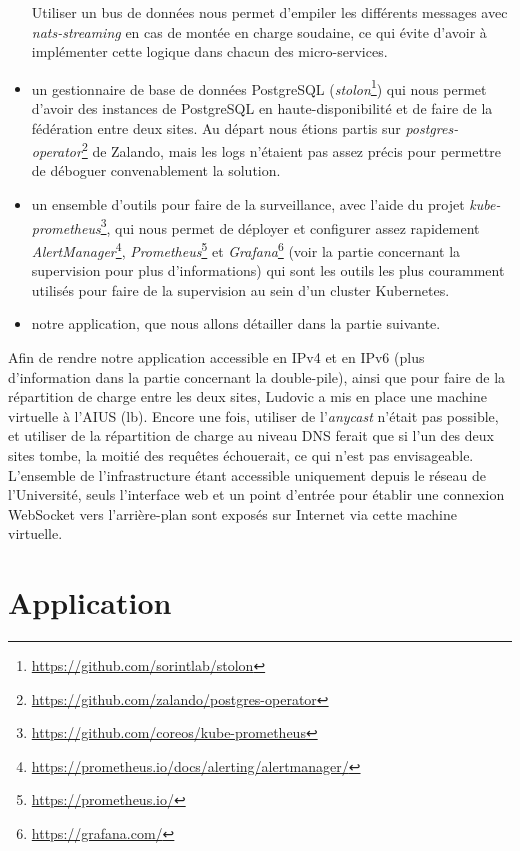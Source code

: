 \begin{itemize}
  Utiliser un bus de données nous permet d'empiler les différents
  messages avec \textit{nats-streaming} en cas de montée en charge
  soudaine, ce qui évite d'avoir à implémenter cette logique dans chacun
  des micro-services.
\item
  un gestionnaire de base de données PostgreSQL
  (\textit{stolon}\footnote{\url{https://github.com/sorintlab/stolon}})
  qui nous permet d'avoir des instances de PostgreSQL en
  haute-disponibilité et de faire de la fédération entre deux sites. Au
  départ nous étions partis sur
  \textit{postgres-operator}\footnote{
    \url{https://github.com/zalando/postgres-operator}}
  de Zalando, mais les logs n'étaient pas assez précis pour permettre de
  déboguer convenablement la solution.
\item
  un ensemble d'outils pour faire de la surveillance, avec l'aide du
  projet \textit{kube-prometheus}\footnote{
    \url{https://github.com/coreos/kube-prometheus}},
  qui nous permet de déployer et configurer assez rapidement
  \textit{AlertManager}\footnote{
    \url{https://prometheus.io/docs/alerting/alertmanager/}},
  \textit{Prometheus}\footnote{\url{https://prometheus.io/}} et
  \textit{Grafana}\footnote{\url{https://grafana.com/}} (voir
  la partie concernant la supervision pour plus d'informations) qui sont
  les outils les plus couramment utilisés pour faire de la supervision
  au sein d'un cluster Kubernetes.
\item
  notre application, que nous allons détailler dans la partie suivante.
\end{itemize}

Afin de rendre notre application accessible en IPv4 et en IPv6 (plus
d'information dans la partie concernant la double-pile), ainsi que pour
faire de la répartition de charge entre les deux sites, Ludovic a mis en
place une machine virtuelle à l'AIUS (lb). Encore une fois, utiliser de
l'\textit{anycast} n'était pas possible, et utiliser de la répartition de
charge au niveau DNS ferait que si l'un des deux sites tombe, la moitié
des requêtes échouerait, ce qui n'est pas envisageable. L'ensemble de
l'infrastructure étant accessible uniquement depuis le réseau de
l'Université, seuls l'interface web et un point d'entrée pour établir
une connexion WebSocket vers l'arrière-plan sont exposés sur Internet
via cette machine virtuelle.

\section{Application}

